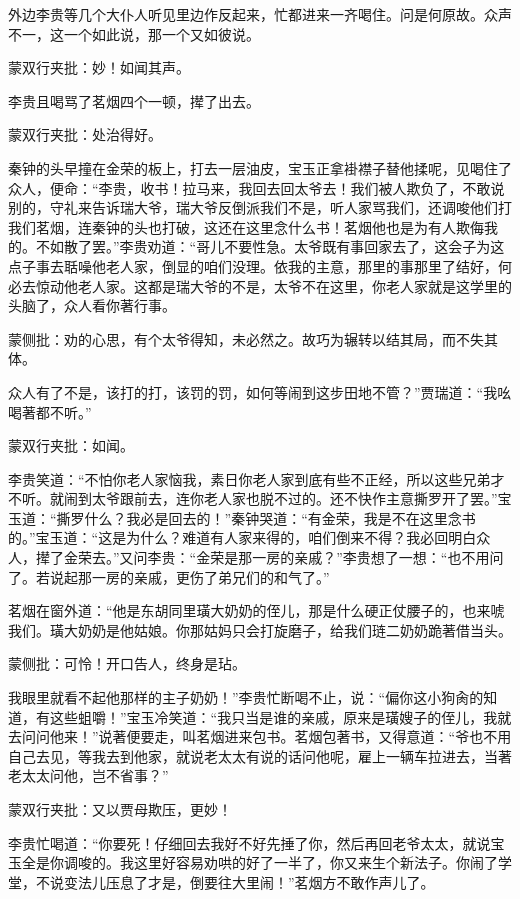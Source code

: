 \begin{parag}
    外边李贵等几个大仆人听见里边作反起来，忙都进来一齐喝住。问是何原故。众声不一，这一个如此说，那一个又如彼说。\begin{note}蒙双行夹批：妙！如闻其声。\end{note}李贵且喝骂了茗烟四个一顿，撵了出去。\begin{note}蒙双行夹批：处治得好。\end{note}秦钟的头早撞在金荣的板上，打去一层油皮，宝玉正拿褂襟子替他揉呢，见喝住了众人，便命：“李贵，收书！拉马来，我回去回太爷去！我们被人欺负了，不敢说别的，守礼来告诉瑞大爷，瑞大爷反倒派我们不是，听人家骂我们，还调唆他们打我们茗烟，连秦钟的头也打破，这还在这里念什么书！茗烟他也是为有人欺侮我的。不如散了罢。”李贵劝道：“哥儿不要性急。太爷既有事回家去了，这会子为这点子事去聒噪他老人家，倒显的咱们没理。依我的主意，那里的事那里了结好，何必去惊动他老人家。这都是瑞大爷的不是，太爷不在这里，你老人家就是这学里的头脑了，众人看你著行事。\begin{note}蒙侧批：劝的心思，有个太爷得知，未必然之。故巧为辗转以结其局，而不失其体。\end{note}众人有了不是，该打的打，该罚的罚，如何等闹到这步田地不管？”贾瑞道：“我吆喝著都不听。”\begin{note}蒙双行夹批：如闻。\end{note}李贵笑道：“不怕你老人家恼我，素日你老人家到底有些不正经，所以这些兄弟才不听。就闹到太爷跟前去，连你老人家也脱不过的。还不快作主意撕罗开了罢。”宝玉道：“撕罗什么？我必是回去的！”秦钟哭道：“有金荣，我是不在这里念书的。”宝玉道：“这是为什么？难道有人家来得的，咱们倒来不得？我必回明白众人，撵了金荣去。”又问李贵：“金荣是那一房的亲戚？”李贵想了一想：“也不用问了。若说起那一房的亲戚，更伤了弟兄们的和气了。”
\end{parag}


\begin{parag}
    茗烟在窗外道：“他是东胡同里璜大奶奶的侄儿，那是什么硬正仗腰子的，也来唬我们。璜大奶奶是他姑娘。你那姑妈只会打旋磨子，给我们琏二奶奶跪著借当头。\begin{note}蒙侧批：可怜！开口告人，终身是玷。\end{note}我眼里就看不起他那样的主子奶奶！”李贵忙断喝不止，说：“偏你这小狗肏的知道，有这些蛆嚼！”宝玉冷笑道：“我只当是谁的亲戚，原来是璜嫂子的侄儿，我就去问问他来！”说著便要走，叫茗烟进来包书。茗烟包著书，又得意道：“爷也不用自己去见，等我去到他家，就说老太太有说的话问他呢，雇上一辆车拉进去，当著老太太问他，岂不省事？”\begin{note}蒙双行夹批：又以贾母欺压，更妙！\end{note}李贵忙喝道：“你要死！仔细回去我好不好先捶了你，然后再回老爷太太，就说宝玉全是你调唆的。我这里好容易劝哄的好了一半了，你又来生个新法子。你闹了学堂，不说变法儿压息了才是，倒要往大里闹！”茗烟方不敢作声儿了。
\end{parag}


